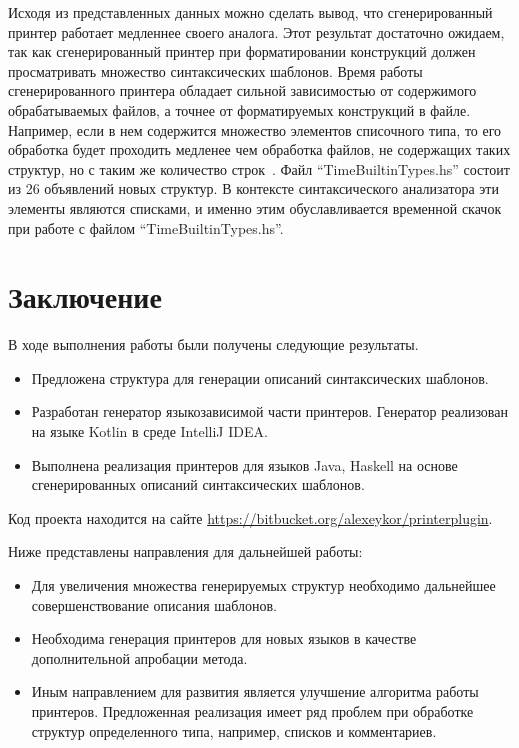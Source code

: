 Исходя из представленных данных можно сделать вывод, что сгенерированный принтер работает медленнее своего аналога. Этот результат достаточно ожидаем, так как сгенерированный принтер при форматировании конструкций должен просматривать множество синтаксических шаблонов. Время работы сгенерированного принтера обладает сильной зависимостью от содержимого обрабатываемых файлов, а точнее от форматируемых конструкций в файле. Например, если в нем содержится множество элементов списочного типа, то его обработка будет проходить медленее чем обработка файлов, не содержащих таких структур, но с таким же количество строк~\cite{podkopaev:diploma}. Файл ``TimeBuiltinTypes.hs'' состоит из 26 объявлений новых структур. В контексте синтаксического анализатора эти элементы являются списками, и именно этим обуславливается временной скачок при работе с файлом ``TimeBuiltinTypes.hs''.

\section*{Заключение}
В ходе выполнения работы были получены следующие результаты.
\begin{itemize}
\item Предложена структура для генерации описаний синтаксических шаблонов.
\item Разработан генератор языкозависимой части принтеров. Генератор реализован на языке Kotlin в среде IntelliJ IDEA.
\item Выполнена реализация принтеров для языков Java, Haskell на основе сгенерированных описаний синтаксических шаблонов.
\end{itemize}

Код проекта находится на сайте \url{https://bitbucket.org/alexeykor/printerplugin}.


Ниже представлены направления для дальнейшей работы:

\begin{itemize}
\item Для увеличения множества генерируемых структур необходимо дальнейшее совершенствование описания шаблонов.
\item Необходима генерация принтеров для новых языков в качестве дополнительной апробации метода.
\item Иным направлением для развития является улучшение алгоритма работы принтеров. Предложенная реализация имеет ряд проблем при обработке структур определенного типа, например, списков и комментариев.
\end{itemize}

